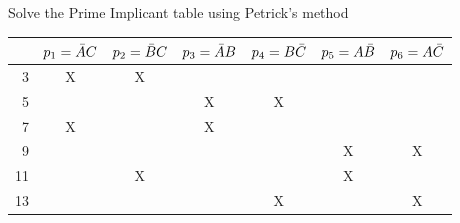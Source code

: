\begin{example}
  Solve the Prime Implicant table using Petrick's method\\
  \begin{tabular}{r|cccccc}
    \toprule
    & $p_1 = \bar{A} C$ & $p_2 = \bar{B} C$ & $p_3 = \bar{A} B$ & $p_4 = B \bar{C}$& $p_5 = A\bar{B}$ & $p_6 = A \bar{C}$ \\
    \midrule
     3 & X & X &   &   &   &   \\
     5 &   &   & X & X &   &   \\
     7 & X &   & X &   &   &   \\
     9 &   &   &   &   & X & X \\
    11 &   & X &   &   & X &   \\
    13 &   &   &   & X &   & X \\
    \bottomrule
  \end{tabular}
\end{example}
\vspace{20em}


